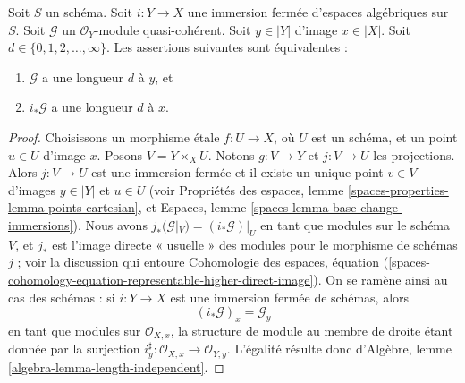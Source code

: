 \begin{lemma}
\label{lemma-length-closed-immersion}
Soit $S$ un schéma. Soit $i : Y \to X$ une immersion fermée d'espaces
algébriques sur $S$. Soit $\mathcal{G}$ un $\mathcal{O}_Y$-module
quasi-cohérent. Soit $y \in |Y|$ d'image $x \in |X|$. Soit $d \in \{0,
1, 2, \ldots, \infty\}$. Les assertions suivantes sont équivalentes :
\begin{enumerate}
\item $\mathcal{G}$ a une longueur $d$ à $y$, et
\item $i_*\mathcal{G}$ a une longueur $d$ à $x$.
\end{enumerate}
\end{lemma}

\begin{proof}
Choisissons un morphisme \'etale $f : U \to X$, où $U$ est un schéma, et un
point $u \in U$ d'image $x$. Posons $V = Y \times_X U$. Notons $g : V \to Y$
et $j : V \to U$ les projections. Alors $j : V \to U$ est une immersion fermée
et il existe un unique point $v \in V$ d'images $y \in |Y|$ et $u \in U$
(voir Propriétés des espaces, lemme
\ref{spaces-properties-lemma-points-cartesian}, et Espaces, lemme
\ref{spaces-lemma-base-change-immersions}). Nous avons $j_*(\mathcal{G}|_V) =
(i_*\mathcal{G})|_U$ en tant que modules sur le schéma $V$, et $j_*$ est
l'image directe « usuelle » des modules pour le morphisme de schémas $j$ ;
voir la discussion qui entoure Cohomologie des espaces, équation
(\ref{spaces-cohomology-equation-representable-higher-direct-image}). On se
ramène ainsi au cas des schémas : si $i : Y \to X$ est une immersion fermée de
schémas, alors
$$
(i_*\mathcal{G})_x = \mathcal{G}_y
$$
en tant que modules sur $\mathcal{O}_{X, x}$, la structure de module au membre
de droite étant donnée par la surjection $i_y^\sharp : \mathcal{O}_{X, x} \to
\mathcal{O}_{Y, y}$. L'égalité résulte donc d'Algèbre, lemme
\ref{algebra-lemma-length-independent}.
\end{proof}

